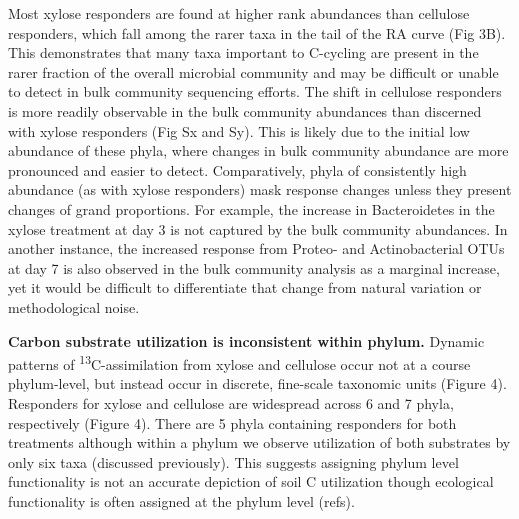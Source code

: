 Most xylose responders are found at higher rank abundances than cellulose responders, which fall among the rarer taxa in the tail of the RA curve (Fig 3B). This demonstrates that many taxa important to C-cycling are present in the rarer fraction of the overall microbial community and may be difficult or unable to detect in bulk community sequencing efforts. The shift in cellulose responders is more readily observable in the bulk community abundances than discerned with xylose responders (Fig Sx and Sy). This is likely due to the initial low abundance of these phyla, where changes in bulk community abundance are more pronounced and easier to detect. Comparatively, phyla of consistently high abundance (as with xylose responders) mask response changes unless they present changes of grand proportions. For example, the increase in Bacteroidetes in the xylose treatment at day 3 is not captured by the bulk community abundances. In another instance, the increased response from Proteo- and Actinobacterial OTUs at day 7 is also observed in the bulk community analysis as a marginal increase, yet it would be difficult to differentiate that change from natural variation or methodological noise.



\textbf{Carbon substrate utilization is inconsistent within phylum.} Dynamic patterns of \textsuperscript{13}C-assimilation from xylose and cellulose occur not at a course phylum-level, but instead occur in discrete, fine-scale taxonomic units (Figure 4). Responders for xylose and cellulose are widespread across 6 and 7 phyla, respectively (Figure 4). There are 5 phyla containing responders for both treatments although within a phylum we observe utilization of both substrates by only six taxa (discussed previously). This suggests assigning phylum level functionality is not an accurate depiction of soil C utilization though ecological functionality is often assigned at the phylum level (refs).

